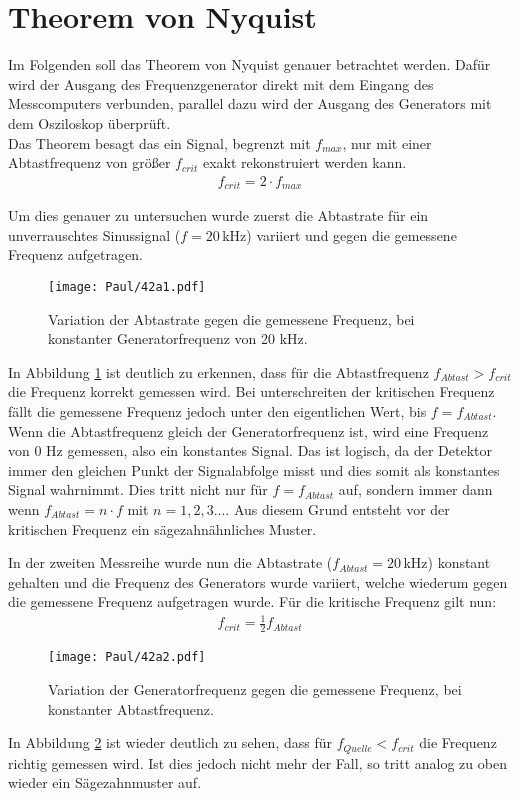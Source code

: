\section{Theorem von Nyquist}

Im Folgenden soll das Theorem von Nyquist genauer betrachtet werden. Dafür wird der Ausgang des Frequenzgenerator direkt mit dem Eingang des Messcomputers verbunden, parallel dazu wird der Ausgang des Generators mit dem Osziloskop überprüft.\\
Das Theorem besagt das ein Signal, begrenzt mit $f_{max}$, nur mit einer Abtastfrequenz von größer $f_{crit}$ exakt rekonstruiert werden kann.
\begin{align}
    f_{crit} = 2 \cdot f_{max}
\end{align}


Um dies genauer zu untersuchen wurde zuerst die Abtastrate für ein unverrauschtes Sinussignal ($f = 20$\,kHz) variiert und gegen die gemessene Frequenz aufgetragen.
\begin{figure}[h]
    \centering
    \texttt{[image: Paul/42a1.pdf]}
    \caption{Variation der Abtastrate gegen die gemessene Frequenz, bei konstanter Generatorfrequenz von 20 kHz.}
    \label{fig:42a1}
\end{figure}

In Abbildung \ref{fig:42a1} ist deutlich zu erkennen, dass für die Abtastfrequenz $f_{Abtast} > f_{crit}$ die Frequenz korrekt gemessen wird. Bei unterschreiten der kritischen Frequenz fällt die gemessene Frequenz jedoch unter den eigentlichen Wert, bis $f = f_{Abtast}$. Wenn die Abtastfrequenz gleich der Generatorfrequenz ist, wird eine Frequenz von 0 Hz gemessen, also ein konstantes Signal. Das ist logisch, da der Detektor immer den gleichen Punkt der Signalabfolge misst und dies somit als konstantes Signal wahrnimmt. Dies tritt nicht nur für $f = f_{Abtast}$ auf, sondern immer dann wenn $f_{Abtast} = n \cdot f$ mit $ n= 1,2,3...$. Aus diesem Grund entsteht vor der kritischen Frequenz ein sägezahnähnliches Muster.

\newpage
In der zweiten Messreihe wurde nun die Abtastrate ($f_{Abtast} = 20$\,kHz) konstant gehalten und die Frequenz des Generators wurde variiert, welche wiederum gegen die gemessene Frequenz aufgetragen wurde. Für die kritische Frequenz gilt nun:
\begin{align}
    f_{crit} = \frac{1}{2} f_{Abtast}
\end{align}
\begin{figure}[h]
    \centering
    \texttt{[image: Paul/42a2.pdf]}
    \caption{Variation der Generatorfrequenz gegen die gemessene Frequenz, bei konstanter Abtastfrequenz.}
    \label{fig:42a2}
\end{figure}
In Abbildung \ref{fig:42a2} ist wieder deutlich zu sehen, dass für $f_{Quelle} < f_{crit}$ die Frequenz richtig gemessen wird. Ist dies jedoch nicht mehr der Fall, so tritt analog zu oben wieder ein Sägezahnmuster auf.


